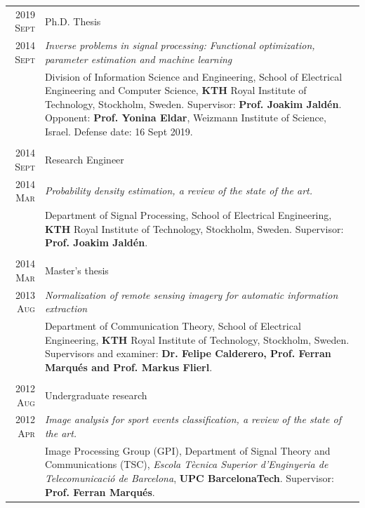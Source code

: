 \documentclass[a4paper,10pt]{article}
\begin{document}
    \begin{tabular}{r|p{13cm}}
    
      \textsc{2019 Sept} 	& Ph.D. Thesis \\
      \textsc{2014 Sept} 	& \emph{Inverse problems in signal processing: Functional optimization, parameter estimation and machine learning} \\
				& \footnotesize{ Division of Information Science and Engineering, School of Electrical Engineering and Computer Science,
				  \textbf{KTH} Royal Institute of Technology, Stockholm, Sweden. Supervisor: \textbf{Prof. Joakim Jald\'{e}n}. 
				  Opponent: \textbf{Prof. Yonina Eldar}, Weizmann Institute of Science, Israel.
				  Defense date: 16 Sept 2019.
				  } \\
      \multicolumn{2}{c}{} \\

      \textsc{2014 Sept} 	& Research Engineer \\
      \textsc{2014 Mar} 	& \emph{Probability density estimation, a review of the state of the art.} \\ 
				& \footnotesize{Department of Signal Processing, School of Electrical Engineering,
				  \textbf{KTH} Royal Institute of Technology, Stockholm, Sweden. Supervisor: \textbf{Prof. Joakim Jald\'{e}n}.} \\
      \multicolumn{2}{c}{} \\

      \textsc{2014 Mar} 	& Master's thesis \\
      \textsc{2013 Aug} 	& \emph{ Normalization of remote sensing imagery for automatic information extraction } \\ 
				& \footnotesize{Department of Communication Theory, School of Electrical Engineering,
				  \textbf{KTH} Royal Institute of Technology, Stockholm, Sweden. Supervisors and examiner: \textbf{Dr. Felipe Calderero, Prof. Ferran Marqu\'{e}s and Prof. Markus Flierl}.} \\
      \multicolumn{2}{c}{} \\


      \textsc{2012 Aug} 	& Undergraduate research \\
      \textsc{2012 Apr} 	& \emph{Image analysis for sport events classification, a review of the state of the art.} \\ 
				& \footnotesize{Image Processing Group (GPI), Department of Signal Theory and 
				  Communications (TSC), \emph{Escola T\`{e}cnica Superior d'Enginyeria de Telecomunicaci\'{o} 
				  de Barcelona}, \textbf{UPC BarcelonaTech}. Supervisor: \textbf{Prof. Ferran Marqu\'{e}s}.} \\

    \end{tabular}
\end{document}
